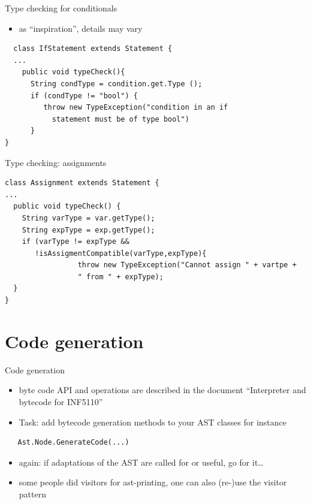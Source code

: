 \documentclass{beamer}
\begin{document}
\begin{frame}[label={sec:orgde41a58},fragile,plain]{Type checking for conditionals}
 \begin{itemize}
\item as ``inspiration'', details may vary
\end{itemize}


\lstset{language=java,label= ,caption= ,captionpos=b,numbers=none}
\begin{lstlisting}
  class IfStatement extends Statement {
  ...
    public void typeCheck(){
      String condType = condition.get.Type ();
      if (condType != "bool") {  
         throw new TypeException("condition in an if 
           statement must be of type bool")
      }
}
\end{lstlisting}
\end{frame}


\begin{frame}[label={sec:org8d26e14},fragile,plain]{Type checking: assignments}
 \lstset{language=java,label= ,caption= ,captionpos=b,numbers=none}
\begin{lstlisting}
class Assignment extends Statement {
...
  public void typeCheck() {
    String varType = var.getType();
    String expType = exp.getType();
    if (varType != expType &&
       !isAssigmentCompatible(varType,expType){
                 throw new TypeException("Cannot assign " + vartpe + 
                 " from " + expType);
  }
}

\end{lstlisting}
\end{frame}



\section{Code generation}
\label{sec:org4e676d0}
\begin{frame}[label={sec:org0687f63},fragile]{Code generation}
 \begin{itemize}
\item byte code API and operations are described in the document ``Interpreter
and bytecode for INF5110''

\item \alert{Task:} add bytecode generation methods to your AST classes
for instance
\end{itemize}

\begin{verbatim}
   Ast.Node.GenerateCode(...)
\end{verbatim}
\begin{itemize}
\item again: if adaptations of the AST are called for or useful, go for it\ldots{}

\item some people did visitors for ast-printing, one can also (re-)use the visitor pattern
\end{itemize}
\end{frame}
\end{document}
